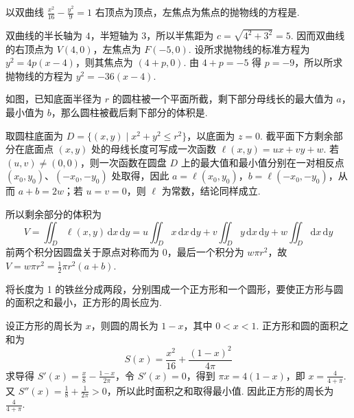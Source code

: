 \begin{problem}
以双曲线 \(\frac{x^2}{16}-\frac{y^2}{9}=1\) 右顶点为顶点，左焦点为焦点的抛物线的方程是\fillinblank{}.

\begin{solution}
双曲线的半长轴为 \(4\)，半短轴为 \(3\)，所以半焦距为 \(c=\sqrt{4^2+3^2}=5\). 因而双曲线的右顶点为 \(V(4,0)\)，左焦点为 \(F(-5,0)\). 设所求抛物线的标准方程为 \(y^2=4p(x-4)\)，则其焦点为 \((4+p,0)\). 由 \(4+p=-5\) 得 \(p=-9\)，所以所求抛物线的方程为 \(y^2=-36(x-4)\).
\end{solution}
\end{problem}

\begin{problem}
如图，已知底面半径为 \(r\) 的圆柱被一个平面所截，剩下部分母线长的最大值为 \(a\)，最小值为 \(b\)，那么圆柱被截后剩下部分的体积是\fillinblank{}.


\begin{solution}
取圆柱底面为 \(D=\{(x,y)\mid x^2+y^2\leqslant r^2\}\)，以底面为 \(z=0\). 截平面下方剩余部分在底面点 \((x,y)\) 处的母线长度可写成一次函数 \(\ell(x,y)=ux+vy+w\). 若 \((u,v)\ne(0,0)\)，则一次函数在圆盘 \(D\) 上的最大值和最小值分别在一对相反点 \((x_0,y_0)\)、\((-x_0,-y_0)\) 处取得，因此 \(a=\ell(x_0,y_0)\)，\(b=\ell(-x_0,-y_0)\)，从而 \(a+b=2w\)；若 \(u=v=0\)，则 \(\ell\) 为常数，结论同样成立.

所以剩余部分的体积为
\[
V=\iint_D\ell(x,y)\,\mathrm d x\,\mathrm d y
=u\iint_Dx\,\mathrm d x\,\mathrm d y
+v\iint_Dy\,\mathrm d x\,\mathrm d y
+w\iint_D\mathrm d x\,\mathrm d y
\]
前两个积分因圆盘关于原点对称而为 \(0\)，最后一个积分为 \(w\pi r^2\)，故 \(V=w\pi r^2=\frac12\pi r^2(a+b)\).
\end{solution}
\end{problem}

\begin{problem}
将长度为 1 的铁丝分成两段，分别围成一个正方形和一个圆形，要使正方形与圆的面积之和最小，正方形的周长应为\fillinblank{}.

\begin{solution}
设正方形的周长为 \(x\)，则圆的周长为 \(1-x\)，其中 \(0<x<1\). 正方形和圆的面积之和为
\[
S(x)=\frac{x^2}{16}+\frac{(1-x)^2}{4\pi}
\]
求导得 \(S'(x)=\frac{x}{8}-\frac{1-x}{2\pi}\)，令 \(S'(x)=0\)，得到 \(\pi x=4(1-x)\)，即 \(x=\frac{4}{4+\pi}\). 又 \(S''(x)=\frac18+\frac{1}{2\pi}>0\)，所以此时面积之和取得最小值. 因此正方形的周长为 \(\frac{4}{4+\pi}\).
\end{solution}
\end{problem}

